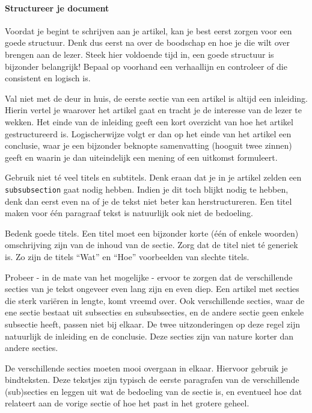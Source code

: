 \documentclass[a4paper]{article}
\begin{document}
\paragraph{Structureer je document}

Voordat je begint te schrijven aan je artikel, kan je best eerst zorgen voor een goede structuur.
Denk dus eerst na over de boodschap en hoe je die wilt over brengen aan de lezer.
Steek hier voldoende tijd in, een goede structuur is bijzonder belangrijk!
Bepaal op voorhand een verhaallijn en controleer of die consistent en logisch is.

Val niet met de deur in huis, de eerste sectie van een artikel is altijd een inleiding.
Hierin vertel je waarover het artikel gaat en tracht je de interesse van de lezer te wekken.
Het einde van de inleiding geeft een kort overzicht van hoe het artikel gestructureerd is.
Logischerwijze volgt er dan op het einde van het artikel een conclusie, waar je een bijzonder beknopte samenvatting (hooguit twee zinnen) geeft en waarin je dan uiteindelijk een mening of een uitkomst formuleert.

Gebruik niet t\'e veel titels en subtitels.
Denk eraan dat je in je artikel zelden een \texttt{\\subsubsection} gaat nodig hebben.
Indien je dit toch blijkt nodig te hebben, denk dan eerst even na of je de tekst niet beter kan herstructureren.
Een titel maken voor \'e\'en paragraaf tekst is natuurlijk ook niet de bedoeling.

Bedenk goede titels.
Een titel moet een bijzonder korte (\'e\'en of enkele woorden) omschrijving zijn van de inhoud van de sectie.
Zorg dat de titel niet t\'e generiek is.
Zo zijn de titels ``Wat'' en ``Hoe'' voorbeelden van slechte titels.

Probeer - in de mate van het mogelijke - ervoor te zorgen dat de verschillende secties van je tekst ongeveer even lang zijn en even diep.
Een artikel met secties die sterk vari\"eren in lengte, komt vreemd over.
Ook verschillende secties, waar de ene sectie bestaat uit subsecties en subsubsecties, en de andere sectie geen enkele subsectie heeft, passen niet bij elkaar.
De twee uitzonderingen op deze regel zijn natuurlijk de inleiding en de conclusie.
Deze secties zijn van nature korter dan andere secties.

De verschillende secties moeten mooi overgaan in elkaar.
Hiervoor gebruik je bindteksten.
Deze tekstjes zijn typisch de eerste paragrafen van de verschillende (sub)secties en leggen uit wat de bedoeling van de sectie is, en eventueel hoe dat relateert aan de vorige sectie of hoe het past in het grotere geheel.
\end{document}
